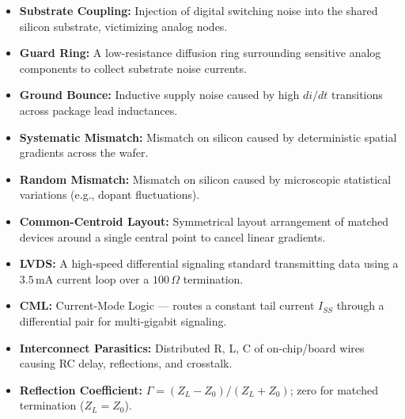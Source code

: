 \documentclass[12pt,a4paper]{article}
\begin{document}
\begin{tcolorbox}[defbox, title={\textbf{One-Line Definitions}}]
\begin{itemize}[leftmargin=*, itemsep=2pt, topsep=0pt]
  \item \textbf{Substrate Coupling:} Injection of digital switching noise into the shared silicon substrate, victimizing analog nodes.
  \item \textbf{Guard Ring:} A low-resistance diffusion ring surrounding sensitive analog components to collect substrate noise currents.
  \item \textbf{Ground Bounce:} Inductive supply noise caused by high $di/dt$ transitions across package lead inductances.
  \item \textbf{Systematic Mismatch:} Mismatch on silicon caused by deterministic spatial gradients across the wafer.
  \item \textbf{Random Mismatch:} Mismatch on silicon caused by microscopic statistical variations (e.g., dopant fluctuations).
  \item \textbf{Common-Centroid Layout:} Symmetrical layout arrangement of matched devices around a single central point to cancel linear gradients.
  \item \textbf{LVDS:} A high-speed differential signaling standard transmitting data using a $3.5\,$mA current loop over a $100\,\Omega$ termination.
  \item \textbf{CML:} Current-Mode Logic --- routes a constant tail current $I_{SS}$ through a differential pair for multi-gigabit signaling.
  \item \textbf{Interconnect Parasitics:} Distributed R, L, C of on-chip/board wires causing RC delay, reflections, and crosstalk.
  \item \textbf{Reflection Coefficient:} $\Gamma = (Z_L - Z_0)/(Z_L + Z_0)$; zero for matched termination ($Z_L = Z_0$).
\end{itemize}
\end{tcolorbox}
\end{document}
